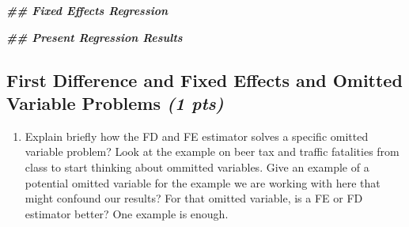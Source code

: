 \documentclass[
]{article}
\newenvironment{Shaded}{\begin{snugshade}}{\end{snugshade}}
\newcommand{\DocumentationTok}[1]{\textcolor[rgb]{0.56,0.35,0.01}{\textbf{\textit{#1}}}}
\providecommand{\tightlist}{%
  \setlength{\itemsep}{0pt}\setlength{\parskip}{0pt}}
\begin{document}
\begin{Shaded}
\begin{Highlighting}[]
\DocumentationTok{\#\# Fixed Effects Regression}

\DocumentationTok{\#\# Present Regression Results}
\end{Highlighting}
\end{Shaded}

\hypertarget{first-difference-and-fixed-effects-and-omitted-variable-problems-1-pts}{%
\subsection{\texorpdfstring{First Difference and Fixed Effects and
Omitted Variable Problems \emph{(1
pts)}}{First Difference and Fixed Effects and Omitted Variable Problems (1 pts)}}\label{first-difference-and-fixed-effects-and-omitted-variable-problems-1-pts}}

\begin{enumerate}
\def\labelenumi{\alph{enumi})}
\setcounter{enumi}{2}
\tightlist
\item
  Explain briefly how the FD and FE estimator solves a specific omitted
  variable problem? Look at the example on beer tax and traffic
  fatalities from class to start thinking about ommitted variables. Give
  an example of a potential omitted variable for the example we are
  working with here that might confound our results? For that omitted
  variable, is a FE or FD estimator better? One example is enough.
\end{enumerate}
\end{document}
